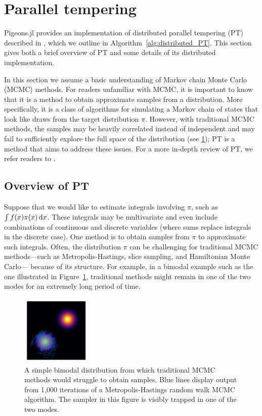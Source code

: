 \section{Parallel tempering}
\label{sec:PT}
Pigeons.jl provides an implementation of distributed parallel tempering (PT) described 
in \cite{syed2021nrpt}, which we outline in Algorithm~\ref{alg:distributed_PT}.
This section gives both a brief overview of PT and some details of 
its distributed implementation.

\medskip 
In this section we assume a basic understanding of 
Markov chain Monte Carlo (MCMC) methods.
For readers unfamiliar with MCMC, it is important to know that 
it is a method to obtain approximate samples from a distribution. 
More specifically, it is a class of algorithms for simulating a Markov chain of 
states that look like draws from the target distribution $\pi$.
However, with traditional 
MCMC methods, the samples may be heavily correlated instead of independent 
and may fail to sufficiently explore the 
full space of the distribution (see \cref{fig:bimodal}); 
PT is a method that aims to address these issues.
For a more in-depth review of PT, we refer readers to \cite{surjanovic2022vpt}.


\subsection{Overview of PT}
Suppose that we would like to estimate integrals involving $\pi$, such as 
$\int f(x) \pi(x) \, \mathrm{d} x$. 
These integrals may be multivariate and even include combinations of 
continuous and discrete variables (where sums replace integrals in the discrete 
case).
One method is to obtain samples from $\pi$ to approximate such integrals.
Often, the distribution 
$\pi$ can be challenging for traditional MCMC methods---such 
as Metropolis-Hastings, slice sampling, and Hamiltonian Monte Carlo---
because of its structure.
For example, in a bimodal example such as the one illustrated in 
Figure~\ref{fig:bimodal},
traditional methods might remain in one of the two modes for an extremely 
long period of time.

\begin{figure}[t]
    \centering
    \includegraphics[width=0.3\textwidth]{img/bimodal.pdf}
    \caption{A simple bimodal distribution from which traditional 
    MCMC methods would struggle to obtain samples. Blue lines display output 
    from 1,000 iterations of a Metropolis-Hastings random walk MCMC algorithm.
    The sampler in this figure is visibly trapped in one of the two modes.}
    \label{fig:bimodal}
\end{figure}

